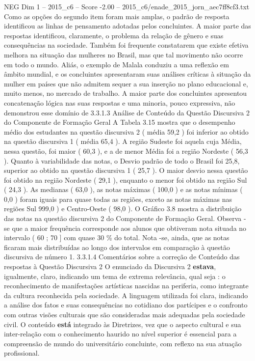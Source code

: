 \begin{textsample}{NEG Dim 1 – 2015\_c6 – Score -2.00 – 2015\_c6/enade\_2015\_jorn\_aec7ff8cf3.txt}
Como as opções do segundo item foram mais amplas, o padrão de resposta identificou as linhas de pensamento adotadas pelos concluintes.
A maior parte das respostas identificou, claramente, o problema da relação de gênero e suas consequências na sociedade.
Também foi frequente constatarem que existe efetiva melhora na situação das mulheres no Brasil, mas que tal movimento não ocorre em todo o mundo.
Aliás, o exemplo de Malala conduziu a uma reflexão em âmbito mundial, e os concluintes apresentaram suas análises críticas à situação da mulher em países que não admitem sequer a sua inserção no plano educacional e, muito menos, no mercado de trabalho.
A maior parte dos concluintes apresentou concatenação lógica nas suas respostas e uma minoria, pouco expressiva, não demonstrou esse domínio de 3.3.1.3 Análise de Conteúdo da Questão Discursiva 2 do Componente de Formação Geral A Tabela 3.15 mostra que o desempenho médio dos estudantes na questão discursiva 2 ( média 59,2 ) foi inferior ao obtido na questão discursiva 1 ( média 65,4 ).
A região Sudeste foi aquela cuja Média, nessa questão, foi maior ( 60,3 ), e a de menor Média foi a região Nordeste ( 56,3 ).
Quanto à variabilidade das notas, o Desvio padrão de todo o Brasil foi 25,8, superior ao obtido na questão discursiva 1 ( 25,7 ).
O maior desvio nessa questão foi obtido na região Nordeste ( 29,1 ), enquanto o menor foi obtido na região Sul ( 24,3 ).
As medianas ( 63,0 ), as notas máximas ( 100,0 ) e as notas mínimas ( 0,0 ) foram iguais para quase todas as regiões, exceto as notas máximas nas regiões Sul 999,0 ) e Centro-Oeste ( 98,0 ).
O Gráfico 3.8 mostra a distribuição das notas na questão discursiva 2 do Componente de Formação Geral.
Observa -se que a maior frequência corresponde aos alunos que obtiveram nota situada no intervalo ( 60 ; 70 ] com quase 30 \% do total.
Nota -se, ainda, que as notas ficaram mais distribuídas ao longo dos intervalos em comparação à questão discursiva de número 1. 3.3.1.4 Comentários sobre a correção de Conteúdo das respostas à Questão Discursiva 2 O enunciado da Discursiva 2 \textbf{estava}, igualmente, claro, indicando um tema de extrema relevância, qual seja : o reconhecimento de manifestações artísticas nascidas na periferia, como integrante da cultura reconhecida pela sociedade.
A linguagem utilizada foi clara, indicando a análise dos fatos e suas consequências no cotidiano dos partícipes e o confronto com outras visões culturais que são consideradas mais adequadas pela sociedade civil.
O conteúdo \textbf{está} integrado às Diretrizes, vez que o aspecto cultural e sua inter-relação com o conhecimento haurido no nível superior é essencial para a compreensão de mundo do universitário concluinte, com reflexo na sua atuação profissional.

\end{textsample}
